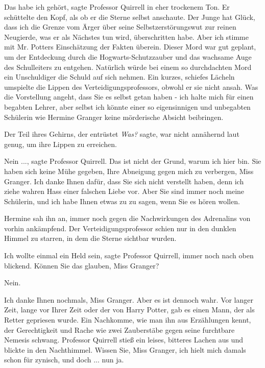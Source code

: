 \glqq Das habe ich gehört\grqq{}, sagte Professor Quirrell in eher trockenem
Ton. Er schüttelte den Kopf, als ob er die Sterne selbst anschaute. \glqq Der
Junge hat Glück, dass ich die Grenze vom Ärger über seine Selbstzerstörungswut
zur reinen Neugierde, was er als Nächstes tun wird, überschritten habe. Aber ich
stimme mit Mr. Potters Einschätzung der Fakten überein. Dieser Mord war gut
geplant, um der Entdeckung durch die Hogwarts-Schutzzauber und das wachsame Auge
des Schulleiters zu entgehen. Natürlich würde bei einem so durchdachten Mord ein
Unschuldiger die Schuld auf sich nehmen.\grqq{} Ein kurzes, schiefes Lächeln
umspielte die Lippen des Verteidigungsprofessors, obwohl er sie nicht ansah.
\glqq Was die Vorstellung angeht, dass Sie es selbst getan haben - ich halte
mich für einen begabten Lehrer, aber selbst ich könnte einer so eigensinnigen
und unbegabten Schülerin wie Hermine Granger keine mörderische Absicht
beibringen.\grqq{}

Der Teil ihres Gehirns, der entrüstet \emph{\glqq Was?\grqq{} } sagte, war nicht
annähernd laut genug, um ihre Lippen zu erreichen.

\glqq Nein ...\grqq{}, sagte Professor Quirrell. \glqq Das ist nicht der Grund,
warum ich hier bin. Sie haben sich keine Mühe gegeben, Ihre Abneigung gegen mich
zu verbergen, Miss Granger. Ich danke Ihnen dafür, dass Sie sich nicht verstellt
haben, denn ich ziehe wahren Hass einer falschen Liebe vor. Aber Sie sind immer
noch meine Schülerin, und ich habe Ihnen etwas zu zu sagen, wenn Sie es hören
wollen.\grqq{}

Hermine sah ihn an, immer noch gegen die Nachwirkungen des Adrenalins von vorhin
ankämpfend. Der Verteidigungsprofessor schien nur in den dunklen Himmel zu
starren, in dem die Sterne sichtbar wurden.

\glqq Ich wollte einmal ein Held sein\grqq{}, sagte Professor Quirrell, immer
noch nach oben blickend. \glqq Können Sie das glauben, Miss Granger?\grqq{}

\glqq Nein.\grqq{}

\glqq Ich danke Ihnen nochmals, Miss Granger. Aber es ist dennoch wahr. Vor
langer Zeit, lange vor Ihrer Zeit oder der von Harry Potter, gab es einen Mann,
der als Retter gepriesen wurde. Ein Nachkomme, wie man ihn aus Erzählungen
kennt, der Gerechtigkeit und Rache wie zwei Zauberstäbe gegen seine furchtbare
Nemesis schwang.\grqq{} Professor Quirrell stieß ein leises, bitteres Lachen aus
und blickte in den Nachthimmel. \glqq Wissen Sie, Miss Granger, ich hielt mich
damals schon für zynisch, und doch ... nun ja.\grqq{}

